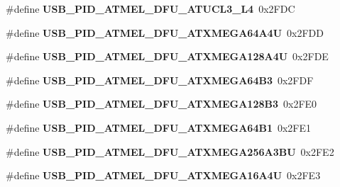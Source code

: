 \begin{DoxyCompactItemize}
\#define {\bfseries U\+S\+B\+\_\+\+P\+I\+D\+\_\+\+A\+T\+M\+E\+L\+\_\+\+D\+F\+U\+\_\+\+A\+T\+U\+C\+L3\+\_\+\+L4}~0x2\+F\+DC
\item 
\mbox{\label{group__usb__atmel__ids__group_gaa29f6fb37c494858780615e56192d5a7}} 
\#define {\bfseries U\+S\+B\+\_\+\+P\+I\+D\+\_\+\+A\+T\+M\+E\+L\+\_\+\+D\+F\+U\+\_\+\+A\+T\+X\+M\+E\+G\+A64\+A4U}~0x2\+F\+DD
\item 
\mbox{\label{group__usb__atmel__ids__group_ga42f45d78bd5b5ea5ddd9b03f506837c8}} 
\#define {\bfseries U\+S\+B\+\_\+\+P\+I\+D\+\_\+\+A\+T\+M\+E\+L\+\_\+\+D\+F\+U\+\_\+\+A\+T\+X\+M\+E\+G\+A128\+A4U}~0x2\+F\+DE
\item 
\mbox{\label{group__usb__atmel__ids__group_ga64c6e4975fdca50988e19b31be232bd1}} 
\#define {\bfseries U\+S\+B\+\_\+\+P\+I\+D\+\_\+\+A\+T\+M\+E\+L\+\_\+\+D\+F\+U\+\_\+\+A\+T\+X\+M\+E\+G\+A64\+B3}~0x2\+F\+DF
\item 
\mbox{\label{group__usb__atmel__ids__group_gaec02e6698096866137d24d10d6fbf736}} 
\#define {\bfseries U\+S\+B\+\_\+\+P\+I\+D\+\_\+\+A\+T\+M\+E\+L\+\_\+\+D\+F\+U\+\_\+\+A\+T\+X\+M\+E\+G\+A128\+B3}~0x2\+F\+E0
\item 
\mbox{\label{group__usb__atmel__ids__group_gae2e17c4706a960d29f0ad72ec40682b9}} 
\#define {\bfseries U\+S\+B\+\_\+\+P\+I\+D\+\_\+\+A\+T\+M\+E\+L\+\_\+\+D\+F\+U\+\_\+\+A\+T\+X\+M\+E\+G\+A64\+B1}~0x2\+F\+E1
\item 
\mbox{\label{group__usb__atmel__ids__group_gafe3023d87ca060c2f83a92b2e7f285c7}} 
\#define {\bfseries U\+S\+B\+\_\+\+P\+I\+D\+\_\+\+A\+T\+M\+E\+L\+\_\+\+D\+F\+U\+\_\+\+A\+T\+X\+M\+E\+G\+A256\+A3\+BU}~0x2\+F\+E2
\item 
\mbox{\label{group__usb__atmel__ids__group_ga74c85652a9b3561d5e4282a84224bd9d}} 
\#define {\bfseries U\+S\+B\+\_\+\+P\+I\+D\+\_\+\+A\+T\+M\+E\+L\+\_\+\+D\+F\+U\+\_\+\+A\+T\+X\+M\+E\+G\+A16\+A4U}~0x2\+F\+E3
\item 
\mbox{\label{group__usb__atmel__ids__group_ga05af83cf2a64475e814c8018ce1d5b7d}} 

\end{DoxyCompactItemize}
